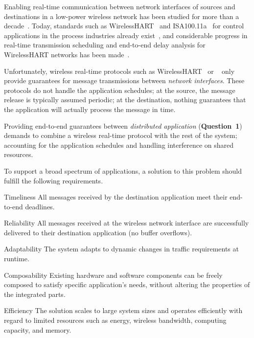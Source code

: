Enabling real-time communication {between network interfaces} of sources and destinations in a low-power wireless network has been studied for more than a decade~\cite{lu2002RAP,stankovic2003Realtime,he2003SPEED}. Today, standards such as WirelessHART~\cite{wirelessHART} and ISA100.11a~\cite{isa100} for control applications in the process industries already exist~\cite{watteyne2017Teaching}, and considerable progress in real-time transmission scheduling and end-to-end delay analysis for WirelessHART networks has been made~\cite{saifullah2010RealTime,saifullah2015EndtoEnd}.

Unfortunately, wireless real-time protocols such as WirelessHART~\cite{wirelessHART} or \blink~\cite{zimmerling2017Blink} only provide guarantees for message transmissions between \emph{network interfaces}. These protocols do not handle the application schedules; at the source, the message release is typically assumed periodic; at the destination, nothing guarantees that the application will actually process the message in time.

Providing end-to-end guarantees between \emph{distributed application} (\textbf{Question~1}) demands to combine a wireless real-time protocol with the rest of the system; \ie accounting for the application schedules and handling interference on shared resources.

To support a broad spectrum of \CPS applications, a solution to this problem should fulfill the following requirements.
\begin{features}

  \item[Timeliness]
  All messages received by the destination application meet their end-to-end deadlines.

  \item[Reliability]
  All messages received at the wireless network interface are {successfully delivered} to their destination application (\ie no buffer overflows).

  \item[Adaptability]
  The system adapts to dynamic changes in traffic requirements at runtime.

  \item[Composability]
  Existing hardware and software components can be freely composed to satisfy specific application's needs, without altering the properties of the integrated parts.

  \item[Efficiency] The solution scales to large system sizes and operates efficiently with regard to limited resources such as energy, wireless bandwidth, computing capacity, and memory.

\end{features}


